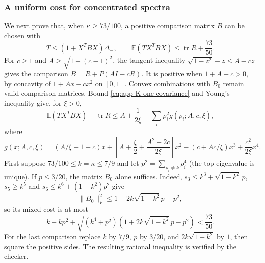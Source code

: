 \documentclass[11pt,a4paper]{article}
\numberwithin{equation}{section}
\begin{document}
\subsubsection{A uniform cost for concentrated spectra}
We next prove that, when $\kappa\ge73/100$, a positive comparison matrix
$B$ can be chosen with
\begin{equation}\label{eq:app-K-one-uniform-cost}
 T\le(1+X^TBX)\Delta_-,\qquad
 \mathbb E(TX^TBX)\le\operatorname{tr}R+\frac{73}{50}.
\end{equation}
For $c\ge1$ and $A\ge\sqrt{1+(c-1)^2}$, the tangent inequality
$\sqrt{1-z^2}-z\le A-cz$ gives the comparison
$B=R+P(AI-cR)$.
It is positive when $1+A-c>0$, by concavity of $1+Ax-cx^2$ on $[0,1]$.
Convex combinations with $B_0$ remain valid comparison matrices.
Bound \eqref{eq:app-K-one-covariance} and Young's inequality give, for $\xi>0$,
\[
 \mathbb E(TX^TBX)-\operatorname{tr}R
 \le A+\frac1{2\xi}+\sum_i\rho_i^2g(\rho_i;A,c,\xi),
\]
where
\[
 g(x;A,c,\xi)=(A/\xi+1-c)x
 +\left[A+\frac\xi2+\frac{A^2-2c}{2\xi}\right]x^2
 -(c+Ac/\xi)x^3+\frac{c^2}{2\xi}x^4.
\]
First suppose $73/100\le k=\kappa\le7/9$ and let
$p^2=\sum_{\rho_i\ne k}\rho_i^4$ (the top eigenvalue is unique).
If $p\le3/20$, the matrix $B_0$ alone suffices. Indeed,
$s_3\le k^3+\sqrt{1-k^2}\,p$, $s_5\ge k^5$ and
$s_6\le k^6+(1-k^2)p^2$ give
\[
 \|B_0\|_F^2\le1+2k\sqrt{1-k^2}\,p-p^2,
\]
so its mixed cost is at most
\[
 k+kp^2+\sqrt{(k^4+p^2)(1+2k\sqrt{1-k^2}\,p-p^2)}
 <\frac{73}{50}.
\]
For the last comparison replace $k$ by $7/9$, $p$ by $3/20$,
and $2k\sqrt{1-k^2}$ by $1$, then square the positive sides.
The resulting rational inequality is verified by the checker.
\end{document}

